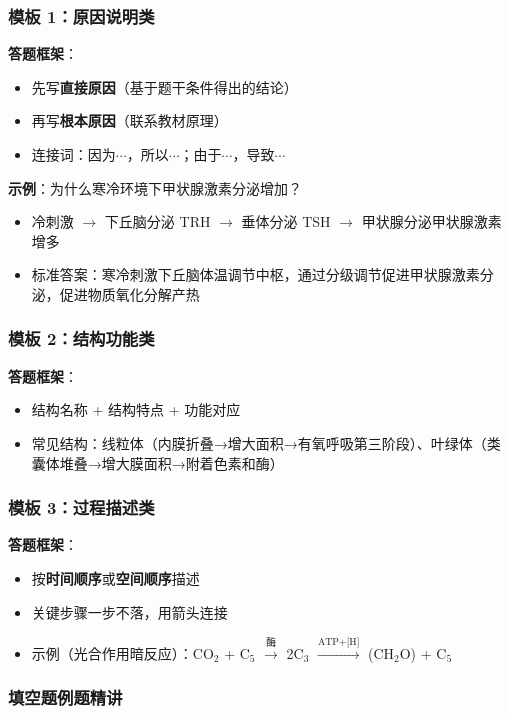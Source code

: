 \subsubsection{模板 1：原因说明类}

\textbf{答题框架}：
\begin{itemize}
  \item 先写\textbf{直接原因}（基于题干条件得出的结论）
  \item 再写\textbf{根本原因}（联系教材原理）
  \item 连接词：因为$\cdots$，所以$\cdots$；由于$\cdots$，导致$\cdots$
\end{itemize}

\textbf{示例}：为什么寒冷环境下甲状腺激素分泌增加？
\begin{itemize}
  \item 冷刺激 $\to$ 下丘脑分泌 TRH $\to$ 垂体分泌 TSH $\to$ 甲状腺分泌甲状腺激素增多
  \item 标准答案：寒冷刺激下丘脑体温调节中枢，通过分级调节促进甲状腺激素分泌，促进物质氧化分解产热
\end{itemize}

\subsubsection{模板 2：结构功能类}

\textbf{答题框架}：
\begin{itemize}
  \item 结构名称 + 结构特点 + 功能对应
  \item 常见结构：线粒体（内膜折叠→增大面积→有氧呼吸第三阶段）、叶绿体（类囊体堆叠→增大膜面积→附着色素和酶）
\end{itemize}

\subsubsection{模板 3：过程描述类}

\textbf{答题框架}：
\begin{itemize}
  \item 按\textbf{时间顺序}或\textbf{空间顺序}描述
  \item 关键步骤一步不落，用箭头连接
  \item 示例（光合作用暗反应）：CO$_2$ + C$_5$ $\xrightarrow{\text{酶}}$ 2C$_3$ $\xrightarrow{\text{ATP+[H]}}$ (CH$_2$O) + C$_5$
\end{itemize}

\subsubsection{填空题例题精讲}

